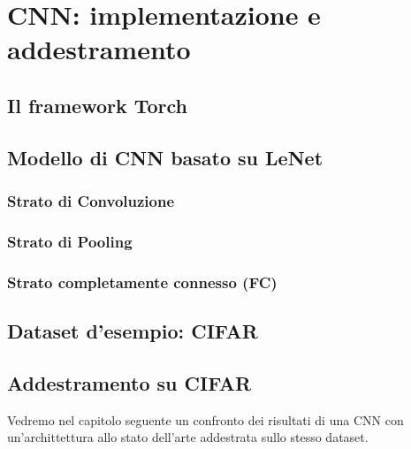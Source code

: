 
\chapter{CNN: implementazione e addestramento} %

\label{Capitolo4} %


\section{Il framework Torch}






\section{Modello di CNN basato su LeNet}

\subsection{Strato di Convoluzione}

\subsection{Strato di Pooling}

\subsection{Strato completamente connesso (FC)}



\section{Dataset d'esempio: CIFAR}

\section{Addestramento su CIFAR}


Vedremo nel capitolo seguente un confronto dei risultati di una CNN con un'archittettura allo stato dell'arte addestrata sullo stesso dataset. 


